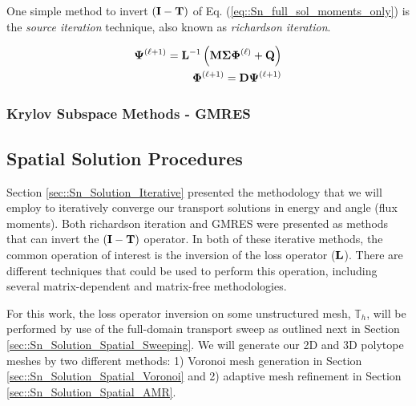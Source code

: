 One simple method to invert $({\bf I} - {\bf T})$ of Eq. (\ref{eq::Sn_full_sol_moments_only}) is the {\em source iteration} technique, also known as {\em richardson iteration}.

\begin{equation}
\label{eq::Sn_si_iter}
\begin{aligned}
 {\bf \Psi}^{(\ell+1)} = {\bf L}^{-1} \left(  {\bf M} {\bf \Sigma} {\bf \Phi}^{(\ell)} +  {\bf Q} \right) \\
{\bf \Phi}^{(\ell+1)} =  {\bf D} {\bf \Psi}^{(\ell+1)}
\end{aligned}
\end{equation}

\subsubsection{Krylov Subspace Methods - GMRES}
\label{sec::Sn_Solution_Iterative_GMRES}

\subsection{Spatial Solution Procedures}
\label{sec::Sn_Solution_Spatial}

Section \ref{sec::Sn_Solution_Iterative} presented the methodology that we will employ to iteratively converge our transport solutions in energy and angle (flux moments). Both richardson iteration and GMRES were presented as methods that can invert the $({\bf I} - {\bf T})$ operator. In both of these iterative methods, the common operation of interest is the inversion of the loss operator (${\bf L}$). There are different techniques that could be used to perform this operation, including several matrix-dependent and matrix-free methodologies. 

For this work, the loss operator inversion on some unstructured mesh, $\mathbb{T}_h$, will be performed by use of the full-domain transport sweep as outlined next in Section \ref{sec::Sn_Solution_Spatial_Sweeping}. We will generate our 2D and 3D polytope meshes by two different methods: 1) Voronoi mesh generation in Section \ref{sec::Sn_Solution_Spatial_Voronoi} and 2) adaptive mesh refinement in Section \ref{sec::Sn_Solution_Spatial_AMR}.

